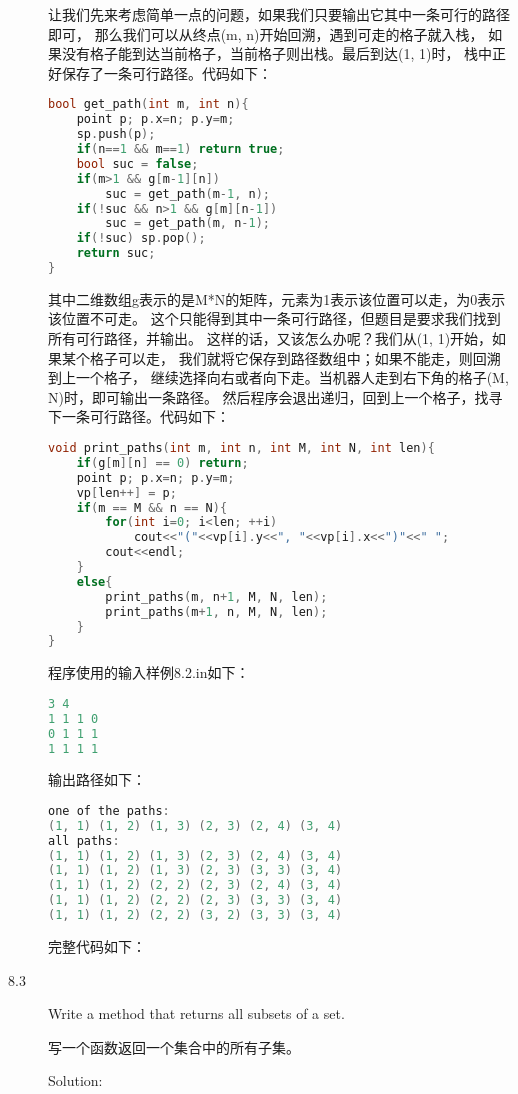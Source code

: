 \begin{description}
让我们先来考虑简单一点的问题，如果我们只要输出它其中一条可行的路径即可， 那么我们可以从终点(m, n)开始回溯，遇到可走的格子就入栈， 如果没有格子能到达当前格子，当前格子则出栈。最后到达(1, 1)时， 栈中正好保存了一条可行路径。代码如下：
\begin{lstlisting}[language=C++]
bool get_path(int m, int n){
    point p; p.x=n; p.y=m;
    sp.push(p);
    if(n==1 && m==1) return true;
    bool suc = false;
    if(m>1 && g[m-1][n])
        suc = get_path(m-1, n);
    if(!suc && n>1 && g[m][n-1])
        suc = get_path(m, n-1);
    if(!suc) sp.pop();
    return suc;
}
\end{lstlisting}
其中二维数组g表示的是M*N的矩阵，元素为1表示该位置可以走，为0表示该位置不可走。 这个只能得到其中一条可行路径，但题目是要求我们找到所有可行路径，并输出。 这样的话，又该怎么办呢？我们从(1, 1)开始，如果某个格子可以走， 我们就将它保存到路径数组中；如果不能走，则回溯到上一个格子， 继续选择向右或者向下走。当机器人走到右下角的格子(M, N)时，即可输出一条路径。 然后程序会退出递归，回到上一个格子，找寻下一条可行路径。代码如下：
\begin{lstlisting}[language=C++]
void print_paths(int m, int n, int M, int N, int len){
    if(g[m][n] == 0) return;
    point p; p.x=n; p.y=m;
    vp[len++] = p;
    if(m == M && n == N){
        for(int i=0; i<len; ++i)
            cout<<"("<<vp[i].y<<", "<<vp[i].x<<")"<<" ";
        cout<<endl;
    }
    else{
        print_paths(m, n+1, M, N, len);
        print_paths(m+1, n, M, N, len);
    }
}
\end{lstlisting}
程序使用的输入样例8.2.in如下：
\begin{lstlisting}[language=C++]
3 4
1 1 1 0
0 1 1 1
1 1 1 1
\end{lstlisting}
输出路径如下：
\begin{lstlisting}[language=C++]
one of the paths:
(1, 1) (1, 2) (1, 3) (2, 3) (2, 4) (3, 4) 
all paths:
(1, 1) (1, 2) (1, 3) (2, 3) (2, 4) (3, 4) 
(1, 1) (1, 2) (1, 3) (2, 3) (3, 3) (3, 4) 
(1, 1) (1, 2) (2, 2) (2, 3) (2, 4) (3, 4) 
(1, 1) (1, 2) (2, 2) (2, 3) (3, 3) (3, 4) 
(1, 1) (1, 2) (2, 2) (3, 2) (3, 3) (3, 4)
\end{lstlisting}
完整代码如下：



\item[8.3] Write a method that returns all subsets of a set.

写一个函数返回一个集合中的所有子集。

Solution: 


\end{description}
